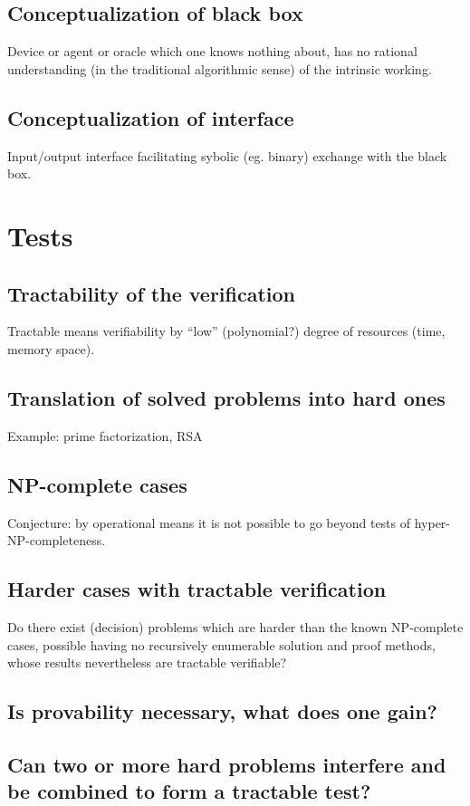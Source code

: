 \subsection{Conceptualization of black box}

Device or agent or oracle which one knows nothing about,
has no rational understanding (in the traditional algorithmic sense) of the intrinsic working.

\subsection{Conceptualization of interface}

Input/output interface facilitating sybolic (eg. binary) exchange
with the black box.


\section{Tests}

\subsection{Tractability of the verification}

Tractable means verifiability by ``low'' (polynomial?)
degree of resources (time, memory space).

\subsection{Translation of solved problems into hard ones}

Example: prime factorization, RSA


\subsection{NP-complete cases}

Conjecture: by operational means it is not possible to go beyond
tests of hyper-NP-completeness.

\subsection{Harder cases with tractable verification}

Do there exist (decision) problems which are harder
than the known NP-complete cases,
possible having no recursively enumerable solution and proof methods,
whose results nevertheless are tractable verifiable?

\subsection{Is provability necessary, what does one gain?}

\subsection{Can two or more hard problems interfere and be combined to form a tractable test?}





